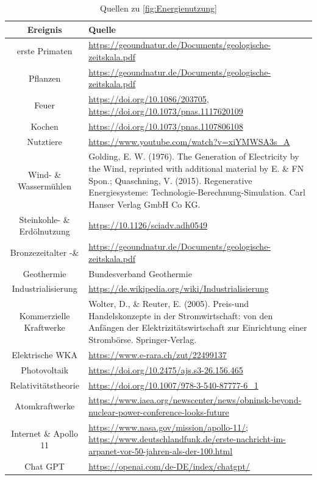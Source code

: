 \documentclass{scrartcl}
\begin{document}
\begin{table}[H]
    \centering
    \begin{tabular}{c|p{10 cm}}
         Ereignis &  Quelle  \\
         \hline
        erste Primaten & \url{ https://geoundnatur.de/Documents/geologische-zeitskala.pdf} \\
        \hline
        Pflanzen & \url{https://geoundnatur.de/Documents/geologische-zeitskala.pdf}  \\
        \hline
        Feuer & \url{https://doi.org/10.1086/203705}, \url{https://doi.org/10.1073/pnas.1117620109} \\
        \hline
        Kochen & \url{https://doi.org/10.1073/pnas.1107806108} \\
        \hline
        Nutztiere & \url{https://www.youtube.com/watch?v=xiYMWSA3s\_A} \\
        \hline
        Wind- \& Wassermühlen & Golding, E. W. (1976). The Generation of Electricity by the Wind, reprinted with additional material by E. \& FN Spon.; Quaschning, V. (2015). Regenerative Energiesysteme: Technologie-Berechnung-Simulation. Carl Hanser Verlag GmbH Co KG. \\
        \hline
        Steinkohle- \& Erdölnutzung & \url{https://10.1126/sciadv.adh0549} \\
        Bronzezeitalter -\& & \url{https://geoundnatur.de/Documents/geologische-zeitskala.pdf} \\ 
        Geothermie & Bundesverband Geothermie \\
        \hline
        Industrialisierung & \url{https://de.wikipedia.org/wiki/Industrialisierung}  \\ 
        \hline
        Kommerzielle Kraftwerke & Wolter, D., \& Reuter, E. (2005). Preis-und Handelskonzepte in der Stromwirtschaft: von den Anfängen der Elektrizitätswirtschaft zur Einrichtung einer Strombörse. Springer-Verlag. \\
        \hline
        Elektrische WKA & \url{https://www.e-rara.ch/zut/22499137 }\\
        \hline
        Photovoltaik & \url{https://doi.org/10.2475/ajs.s3-26.156.465} \\
        \hline
        Relativitätstheorie & \url{https://doi.org/10.1007/978-3-540-87777-6\_1}\\
        \hline
        Atomkraftwerke &  \url{https://www.iaea.org/newscenter/news/obninsk-beyond-nuclear-power-conference-looks-future}\\
        \hline
        Internet \& Apollo 11 & \url{https://www.nasa.gov/mission/apollo-11/}; \url{https://www.deutschlandfunk.de/erste-nachricht-im-arpanet-vor-50-jahren-als-der-100.html}\\
        \hline
        Chat GPT & \url{https://openai.com/de-DE/index/chatgpt/}
    \end{tabular}
    \caption{Quellen zu \ref{fig:Energienutzung}}
    \label{tab:Energiegeschichte}
\end{table}
\end{document}
